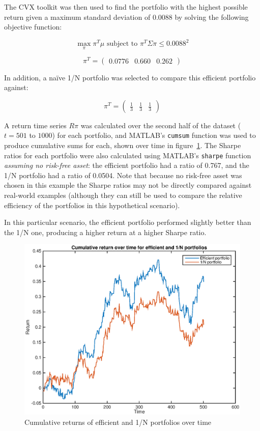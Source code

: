 \documentclass[a4paper, 12pt]{article}
\begin{document}
	The CVX toolkit was then used to find the portfolio with the highest possible return given a maximum standard deviation of 0.0088 by solving the following objective function:

	\[
		\max_{\pi} \pi^T \mu \text{ subject to } \pi^T \Sigma \pi \leq 0.0088^2
	\]

	\[
		\pi^T = \begin{pmatrix}
			0.0776 & 0.660 & 0.262
		\end{pmatrix}
	\]

	In addition, a naïve 1/N portfolio was selected to compare this efficient portfolio against:

	\[
		\pi^T = \begin{pmatrix}
			\frac{1}{3} & \frac{1}{3} & \frac{1}{3}
		\end{pmatrix}
	\]

	A return time series $R\pi$ was calculated over the second half of the dataset ($t = 501$ to $1000$) for each portfolio, and MATLAB's \texttt{cumsum} function was used to produce cumulative sums for each, shown over time in figure~\ref{fig:p2_cumulative_return}. The Sharpe ratios for each portfolio were also calculated using MATLAB's \texttt{sharpe} function \emph{assuming no risk-free asset}: the efficient portfolio had a ratio of 0.767, and the 1/N portfolio had a ratio of 0.0504. Note that because no risk-free asset was chosen in this example the Sharpe ratios may not be directly compared against real-world examples (although they can still be used to compare the relative efficiency of the portfolios in this hypothetical scenario).

	In this particular scenario, the efficient portfolio performed slightly better than the 1/N one, producing a higher return at a higher Sharpe ratio.

	\begin{figure}[b!]
		\begin{center}
			\includegraphics[width=0.75\linewidth]{figures/p2_cumulative_return.eps}
		\end{center}
		\caption{Cumulative returns of efficient and 1/N portfolios over time}
		\label{fig:p2_cumulative_return}
	\end{figure}
\end{document}
